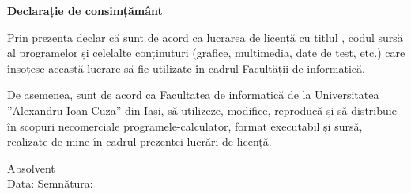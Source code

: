 \vspace*{\fill}
\begin{center}
    \large
    \textbf{Declarație de consimțământ}
\end{center}

Prin prezenta declar că sunt de acord ca lucrarea de licență cu titlul \textbf{\thesistitle}, codul sursă al programelor și celelalte 
conținuturi (grafice, multimedia, date de test, etc.) care însoțesc această lucrare să fie utilizate în cadrul Facultății de informatică.

De asemenea, sunt de acord ca Facultatea de informatică de la Universitatea ”Alexandru-Ioan Cuza” din Iași, să utilizeze, modifice, 
reproducă și să distribuie în scopuri necomerciale programele-calculator, format executabil și sursă, realizate de mine în cadrul 
prezentei lucrări de licență.

\begin{flushright}
    Absolvent \textbf{\authornamefl} \\
    \vspace{0.5cm}
    Data: \dottedline \hspace{6cm} Semnătura: \dottedline
\end{flushright}
\vspace*{\fill}
\pagebreak